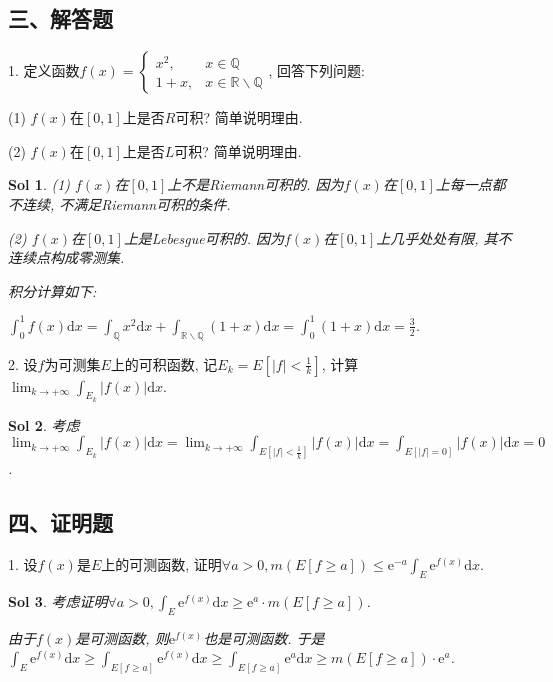 \documentclass[UTF8]{article}
\newtheorem{solution}{Sol}
\begin{document}
  \subsection*{三、解答题}

  1. 定义函数$f(x)=\begin{cases}
    x^2, & x\in \mathbb{Q} \\
    1+x, & x\in \mathbb{R}\backslash \mathbb{Q}
  \end{cases}$, 回答下列问题:\par
  (1) $f(x)$在$[0,1]$上是否$R$可积? 简单说明理由.\par
  (2) $f(x)$在$[0,1]$上是否$L$可积? 简单说明理由.\par

  \begin{solution}
    (1) $f(x)$在$[0,1]$上不是Riemann可积的. 因为$f(x)$在$[0,1]$上每一点都不连续, 不满足Riemann可积的条件.\par
    (2) $f(x)$在$[0,1]$上是Lebesgue可积的. 因为$f(x)$在$[0,1]$上几乎处处有限, 其不连续点构成零测集.\par
    积分计算如下:\par
    $\int_{0}^{1}f(x)\mathrm{d}x=\int_{\mathbb{Q}}x^2\mathrm{d}x+\int_{\mathbb{R}\backslash \mathbb{Q}}(1+x)\mathrm{d}x=\int_{0}^{1}(1+x)\mathrm{d}x=\frac{3}{2}$.\par
  \end{solution}
    
  2. 设$f$为可测集$E$上的可积函数, 记$E_k=E\left[|f|<\frac{1}{k}\right]$, 计算$\lim_{k \to +\infty}\int_{E_k}|f(x)|\mathrm{d}x$.\par

  \begin{solution}
    考虑$\lim_{k \to +\infty}\int_{E_k}|f(x)|\mathrm{d}x=\lim_{k \to +\infty}\int_{E\left[|f|<\frac{1}{k}\right]}|f(x)|\mathrm{d}x=\int_{E\left[|f|=0\right]}|f(x)|\mathrm{d}x=0$.\par
  \end{solution}

  \subsection*{四、证明题}

  1. 设$f(x)$是$E$上的可测函数, 证明$\forall a >0, m(E\left[f\geqslant a\right])\leqslant \mathrm{e}^{-a}\int_{E}\mathrm{e}^{f(x)}\mathrm{d}x$.\par

  \begin{solution}
    考虑证明$\forall a>0, \int_{E}\mathrm{e}^{f(x)}\mathrm{d}x\geqslant \mathrm{e}^a \cdot m(E\left[f\geqslant a\right])$.\par
    由于$f(x)$是可测函数, 则$\mathrm{e}^{f(x)}$也是可测函数. 于是$\int_{E}\mathrm{e}^{f(x)}\mathrm{d}x\geqslant \int_{E\left[f\geqslant a\right]}\mathrm{e}^{f(x)}\mathrm{d}x\geqslant \int_{E[f\geqslant a]}\mathrm{e}^{a}\mathrm{d}x\geqslant m(E[f\geqslant a])\cdot \mathrm{e}^a$.\par
  \end{solution}
\end{document}
